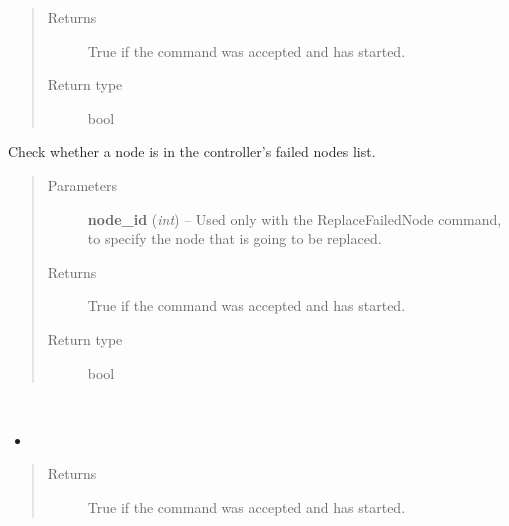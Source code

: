 \documentclass[letterpaper,10pt,english]{sphinxmanual}
\begin{document}
\begin{fulllineitems}
\begin{fulllineitems}
\begin{quote}
\begin{description}
\begin{itemize}
\end{itemize}

\item[{Returns}] \leavevmode
True if the command was accepted and has started.

\item[{Return type}] \leavevmode
bool

\end{description}\end{quote}

\end{fulllineitems}


\begin{fulllineitems}
\label{controller:openzwave.controller.ZWaveController.begin_command_has_node_failed}
Check whether a node is in the controller's failed nodes list.
\begin{quote}\begin{description}
\item[{Parameters}] \leavevmode
\textbf{node\_id} (\emph{int}) -- Used only with the ReplaceFailedNode command, to specify the node that is going to be replaced.

\item[{Returns}] \leavevmode
True if the command was accepted and has started.

\item[{Return type}] \leavevmode
bool

\end{description}\end{quote}

\end{fulllineitems}


\begin{fulllineitems}
\label{controller:openzwave.controller.ZWaveController.begin_command_receive_configuration}~\begin{itemize}
\item {} 
\end{itemize}
\begin{quote}\begin{description}
\item[{Returns}] \leavevmode
True if the command was accepted and has started.


\end{description}
\end{quote}
\end{fulllineitems}
\end{fulllineitems}
\end{document}
